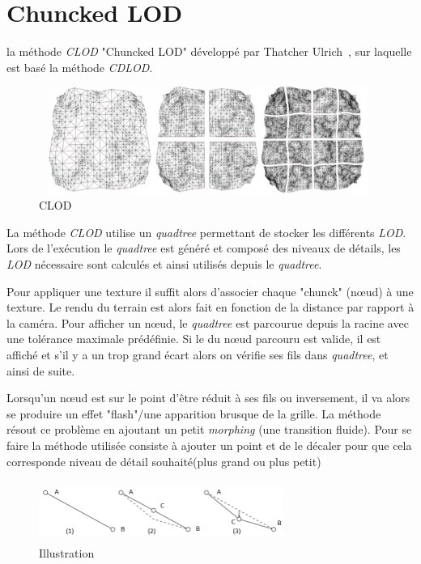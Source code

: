 \section*{Chuncked LOD}
  \label{sec:chunked-lod}

  
  la méthode \textit{CLOD} "Chuncked LOD" développé par Thatcher Ulrich~\cite{CLOD}, sur laquelle est basé la méthode \textit{CDLOD}.

\begin{figure}[!ht]
\centerline{
    \includegraphics[width=11cm,height=3.5cm]{img/clod.png}}
    \caption[CLOD]{CLOD\protect\footnotemark}
    \label{fig:clod}
\end{figure}


  La méthode \emph{CLOD} utilise un \textit{quadtree} permettant de stocker les différents \emph{LOD}. Lors de l'exécution le \emph{quadtree} est généré et composé des niveaux de détails, les \emph{LOD} nécessaire sont calculés et ainsi utilisés depuis le \emph{quadtree}. 
  
  Pour appliquer une texture il suffit alors d'associer chaque "chunck" (n\oe{}ud) à une texture.
  Le rendu du terrain est alors fait en fonction de la distance par rapport à la caméra. Pour afficher un n\oe{}ud, le \emph{quadtree} est parcourue depuis la racine avec une tolérance maximale prédéfinie. Si le du n\oe{}ud parcouru est valide, il est affiché et s'il y a un trop grand écart alors on vérifie ses fils dans \emph{quadtree}, et ainsi de suite.
 
  Lorsqu'un n\oe{}ud est sur le point d'être réduit à ses fils ou inversement, il va alors se produire un effet "flash"/une apparition brusque de la grille. La méthode résout ce problème en ajoutant un petit \emph{morphing} (une transition fluide). Pour se faire la méthode utilisée consiste à ajouter un point et de le décaler pour que cela corresponde niveau de détail souhaité(plus grand ou plus petit)
 
 
 \begin{figure}[!ht]
 \centerline{
    \includegraphics[width=8cm,height=2cm]{img/morph-pop.png}}
    \caption[morph]{ Illustration \protect\footnotemark}
    \label{fig:morph-pop}
\end{figure}

